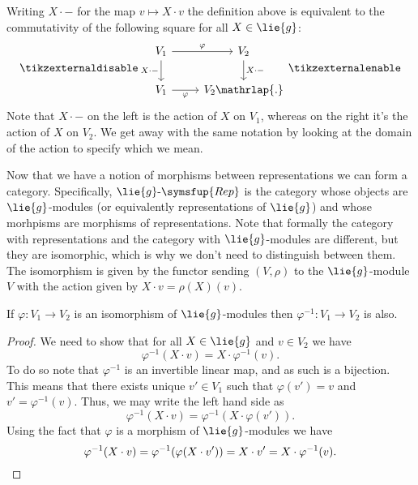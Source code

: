 \documentclass[fleqn]{NotesClass}
\makeatletter
\newcommand{\c@egory}[1]{\symsfup{#1}}
\newcommand{\Rep}[1][\lie{g}]{#1\text{-}\c@egory{Rep}}
\makeatother
\begin{document}
    Writing \(X \cdot {-}\) for the map \(v \mapsto X \cdot v\) the definition above is equivalent to the commutativity of the following square for all \(X \in \lie{g}\):
    \begin{equation}
        \tikzexternaldisable
        \begin{tikzcd}
            V_1 \arrow[r, "\varphi"] \arrow[d, "X \cdot {-}"'] & V_2 \arrow[d, "X \cdot {-}"]\\
            V_1 \arrow[r, "\varphi"'] & V_2\mathrlap{.}
        \end{tikzcd}
        \tikzexternalenable
    \end{equation}
    Note that \(X \cdot {-}\) on the left is the action of \(X\) on \(V_1\), whereas on the right it's the action of \(X\) on \(V_2\).
    We get away with the same notation by looking at the domain of the action to specify which we mean.
    
    Now that we have a notion of morphisms between representations we can form a category.
    Specifically, \(\Rep\) is the category whose objects are \(\lie{g}\)-modules (or equivalently representations of \(\lie{g}\)) and whose morhpisms are morphisms of representations.
    Note that formally the category with representations and the category with \(\lie{g}\)-modules are different, but they are isomorphic, which is why we don't need to distinguish between them.
    The isomorphism is given by the functor sending \((V, \rho)\) to the \(\lie{g}\)-module \(V\) with the action given by \(X \cdot v = \rho(X)(v)\).
    
    \begin{lma}{}{}
        If \(\varphi \colon V_1 \to V_2\) is an isomorphism of \(\lie{g}\)-modules then \(\varphi^{-1} \colon V_1 \to V_2\) is also.
        \begin{proof}
            We need to show that for all \(X \in \lie{g}\) and \(v \in V_2\) we have
            \begin{equation}
                \varphi^{-1}(X \cdot v) = X \cdot \varphi^{-1}(v).
            \end{equation}
            To do so note that \(\varphi^{-1}\) is an invertible linear map, and as such is a bijection.
            This means that there exists unique \(v' \in V_1\) such that \(\varphi(v') = v\) and \(v' = \varphi^{-1}(v)\).
            Thus, we may write the left hand side as
            \begin{equation}
                \varphi^{-1}(X \cdot v) = \varphi^{-1}(X \cdot \varphi(v')).
            \end{equation}
            Using the fact that \(\varphi\) is a morphism of \(\lie{g}\)-modules we have
            \begin{equation}
                \varphi^{-1}(X \cdot v) = \varphi^{-1}(\varphi(X \cdot v')) = X \cdot v' = X \cdot \varphi^{-1}(v). \qedhere
            \end{equation}
        \end{proof}
    \end{lma}
    
\end{document}
